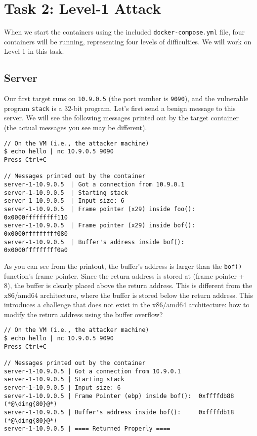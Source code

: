 
\section{Task 2: Level-1 Attack} 


When we start the containers using the included 
\texttt{docker-compose.yml} file, four containers will be 
running, representing four levels of difficulties. 
We will work on Level 1 in this task. 


\subsection{Server} 

Our first target runs on \texttt{10.9.0.5} (the port 
number is \texttt{9090}), and the vulnerable program \texttt{stack}
is a 32-bit program. 
Let's first send a benign message to this server.
We will see the following messages printed out by the target container (the
actual messages you see may be different).

\ifdefined\arm
\begin{lstlisting}
// On the VM (i.e., the attacker machine)
$ echo hello | nc 10.9.0.5 9090
Press Ctrl+C

// Messages printed out by the container
server-1-10.9.0.5  | Got a connection from 10.9.0.1
server-1-10.9.0.5  | Starting stack
server-1-10.9.0.5  | Input size: 6
server-1-10.9.0.5  | Frame pointer (x29) inside foo():  0x0000fffffffff110
server-1-10.9.0.5  | Frame pointer (x29) inside bof():  0x0000fffffffff080
server-1-10.9.0.5  | Buffer's address inside bof():     0x0000fffffffff0a0
\end{lstlisting}

As you can see from the printout, the buffer's address is larger than the 
\texttt{bof()} function's frame pointer. Since the return
address is stored at (frame pointer + 8), the buffer is clearly
placed above the return address. This is different from the x86/amd64
architecture, where the buffer is stored below the 
return address. This introduces a challenge that does not exist
in the x86/amd64 architecture: how to modify the
return address using the buffer overflow? 

\else
\begin{lstlisting}
// On the VM (i.e., the attacker machine)
$ echo hello | nc 10.9.0.5 9090
Press Ctrl+C

// Messages printed out by the container
server-1-10.9.0.5 | Got a connection from 10.9.0.1
server-1-10.9.0.5 | Starting stack
server-1-10.9.0.5 | Input size: 6
server-1-10.9.0.5 | Frame Pointer (ebp) inside bof():  0xffffdb88    (*@\ding{80}@*)
server-1-10.9.0.5 | Buffer's address inside bof():     0xffffdb18    (*@\ding{80}@*)
server-1-10.9.0.5 | ==== Returned Properly ====
\end{lstlisting}
\fi


